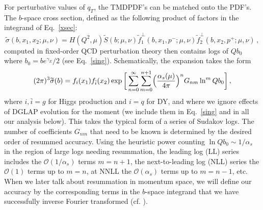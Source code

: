\documentclass[a4,letterpaper,11pt]{article}
\newcommand{\be}{\begin{equation}}
\newcommand{\ee}{\end{equation}}
\newcommand{\as}{\alpha_s}
\newcommand{\cO}{\mathcal{O}}
\newcommand{\wt}{\widetilde}
\newcommand{\eq}[1]{Eq.~\eqref{#1}}
\begin{document}
For perturbative values of $q_T$, the TMDPDF's can be matched onto the PDF's.
The $b$-space cross section, defined as the following product of factors in the integrand of \eq{xsec}:
\be
\label{bxsec}
\wt\sigma(b,x_1,x_2;\mu,\nu) = H(Q^2,\mu) \wt S(b;\mu,\nu) \wt f_1^\perp(b,x_1,p^-;\mu,\nu) \wt f_2^\perp(b,x_2,p^+;\mu,\nu)\,,
\ee
computed in fixed-order QCD perturbation theory then contains logs of $Q b_0$ where $b_0 = b e^{\gamma_E}/2$ (see \eq{sing}). Schematically, the expansion takes the form
\be
\label{logexpansion}
(2\pi)^3\wt\sigma(b) = f_i(x_1)f_{\bar i}(x_2) \exp\bigg[ \sum_{n=0}^\infty\sum_{m=0}^{n+1}\Bigl(\frac{\as(\mu)}{4\pi}\Bigr)^n G_{nm}\ln^m Qb_0\biggr] \,,
\ee
where $i,\bar i= g$ for Higgs production and $i=q$ for DY, and where we ignore effects of DGLAP evolution for the moment (we include them in \eq{sing} and in all our analysis below). This takes the typical form of a series of Sudakov logs. The number of coefficients $G_{nm}$ that need to be known is determined by the desired order of resummed accuracy. Using the heuristic power counting $\ln Qb_0\sim 1/\as$ in the region of large logs needing resummation, the leading log (LL) series includes the $\cO(1/\as)$ terms $m=n+1$, the next-to-leading log (NLL) series the $\cO(1)$ terms up to $m=n$, at NNLL the $\cO(\as)$ terms up to $m=n-1$, etc. When we later talk about resummation in momentum space, we will define our accuracy by the corresponding terms in the $b$-space integrand that we have successfully inverse Fourier transformed (cf. \cite{Almeida:2014uva}).
\end{document}
